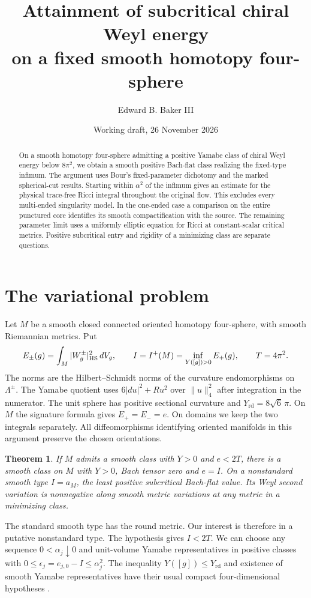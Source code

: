 \documentclass[11pt,letterpaper]{article}
\title{Attainment of subcritical chiral Weyl energy\\on a fixed smooth homotopy four-sphere}
\author{Edward B. Baker III}
\date{Working draft, 26 November 2026}
\newtheorem{theorem}{Theorem}
\newcommand{\Yrd}{Y_{\mathrm{rd}}}
\newcommand{\dV}{\,dV}
\begin{document}
\maketitle
\begin{abstract}
On a smooth homotopy four-sphere admitting a positive Yamabe class of chiral
Weyl energy below \(8\pi^2\), we obtain a smooth positive Bach-flat class
realizing the fixed-type infimum. The argument uses Bour's fixed-parameter
dichotomy and the marked spherical-cut results. Starting within \(\alpha^2\)
of the infimum gives an estimate for the physical trace-free Ricci integral
throughout the original flow. This excludes every multi-ended singularity
model. In the one-ended case a comparison on the entire punctured core
identifies its smooth compactification with the source. The remaining
parameter limit uses a uniformly elliptic equation for Ricci at
constant-scalar critical metrics. Positive subcritical entry and rigidity
of a minimizing class are separate questions.
\end{abstract}

\section{The variational problem}
Let \(M\) be a smooth closed connected oriented homotopy four-sphere,
with smooth Riemannian metrics. Put
\[
 E_\pm(g)=\int_M |W^\pm_g|_{\rm HS}^2\dV_g,\qquad
 I=I^+(M)=\inf_{Y([g])>0}E_+(g),\qquad T=4\pi^2.
\]
The norms are the Hilbert--Schmidt norms of the curvature endomorphisms
on \(\Lambda^\pm\). The Yamabe quotient uses \(6|du|^2+Ru^2\) over
\(\|u\|_4^2\) after integration in the numerator. The unit sphere
has positive sectional curvature and \(\Yrd=8\sqrt6\,\pi\).
On \(M\) the signature formula gives \(E_+=E_-=e\). On domains we
keep the two integrals separately. All diffeomorphisms identifying
oriented manifolds in this argument preserve the chosen orientations.

\begin{theorem}\label{thm:main}
If \(M\) admits a smooth class with \(Y>0\) and \(e<2T\), there is a
smooth class on \(M\) with \(Y>0\), Bach tensor zero and \(e=I\).
On a nonstandard smooth type \(I=a_M\), the least positive subcritical
Bach-flat value. Its Weyl second variation is nonnegative along
smooth metric variations at any metric in a minimizing class.
\end{theorem}

The standard smooth type has the round metric. Our interest is therefore
in a putative nonstandard type. The hypothesis gives \(I<2T\).
We can choose any sequence \(0<\alpha_j\downarrow0\) and unit-volume
Yamabe representatives in positive classes with
\(0\le\epsilon_j=e_{j,0}-I\le\alpha_j^2\). The inequality
\(Y([g])\le\Yrd\) and existence of smooth Yamabe representatives have
their usual compact four-dimensional hypotheses \cite{LeeParker1987Yamabe}.
\end{document}
